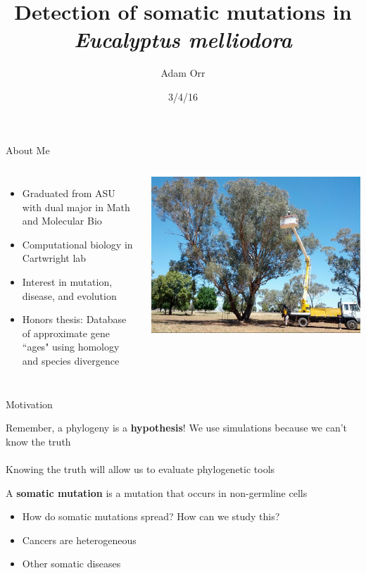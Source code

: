 \documentclass{beamer}
\title[Detecting Somatic Mutations]{Detection of somatic mutations in \textit{Eucalyptus melliodora}}
\date{3/4/16}
\author{Adam Orr}
\begin{document}
\frame{\titlepage}
\begin{frame}{About Me}
	\begin{columns}
			\begin{itemize}
			\item Graduated from ASU with dual major in Math and Molecular Bio
			\item Computational biology in Cartwright lab
			\item Interest in mutation, disease, and evolution
			\item Honors thesis: Database of approximate gene ``ages" using homology and species divergence
			\end{itemize}
			\includegraphics[width=\linewidth]{figures/unlabeled_tree.jpg}
	\end{columns}
\end{frame}

\begin{frame}{Motivation}
	\begin{alertblock}{Remember, a phylogeny is a \textbf{hypothesis}!}
		We use simulations because we can't know the truth \\~\\

		Knowing the truth will allow us to evaluate phylogenetic tools		
	\end{alertblock}

	\begin{definition}
		A \textbf{somatic mutation} is a mutation that occurs in non-germline cells	
	\end{definition}

	\begin{itemize}
	\item How do somatic mutations spread? How can we study this?
	\item Cancers are heterogeneous
	\item Other somatic diseases
	\end{itemize}
\end{frame}
\end{document}
